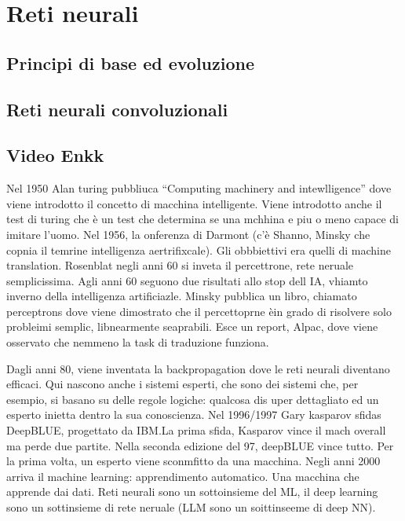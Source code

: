 
\chapter{Reti neurali}\label{chp:neural-networks}
% 


\section{Principi di base ed evoluzione}
% 


\section{Reti neurali convoluzionali}
% 

\section*{Video Enkk}

Nel 1950 Alan turing pubbliuca ``Computing machinery and intewlligence'' dove viene introdotto il concetto di macchina intelligente. Viene introdotto anche il test di turing che è un test che determina se una mchhina e piu o meno capace di imitare l'uomo. Nel 1956, la onferenza di Darmont (c'è Shanno, Minsky che copnia il temrine intelligenza aertrifixcale). Gli obbbiettivi era quelli di machine translation. Rosenblat negli anni 60 si inveta il percettrone, rete neruale semplicissima. Agli anni 60 seguono due risultati allo stop dell IA, vhiamto inverno della intelligenza artificiazle. Minsky pubblica un libro, chiamato perceptrons dove viene dimostrato che il percettoprne èin grado di risolvere solo probleimi semplic, libnearmente seaprabili. Esce un report, Alpac, dove viene osservato che nemmeno la task di traduzione funziona.

Dagli anni 80, viene inventata la backpropagation dove le reti neurali diventano efficaci. Qui nascono anche i sistemi esperti, che sono dei sistemi che, per esempio, si basano su delle regole logiche: qualcosa dis uper dettagliato ed un esperto inietta dentro la sua conoscienza. Nel 1996/1997 Gary kasparov sfidas DeepBLUE, progettato da IBM.\@ La prima sfida, Kasparov vince il mach overall ma perde due partite. Nella seconda edizione del 97, deepBLUE vince tutto. Per la prima volta, un esperto viene sconmfitto da una macchina. Negli anni 2000 arriva il machine learning: apprendimento automatico. Una macchina che apprende dai dati.  Reti neurali sono un sottoinsieme del ML, il deep learning sono un sottinsieme di rete neruale (LLM sono un soittinseeme di deep NN). 

